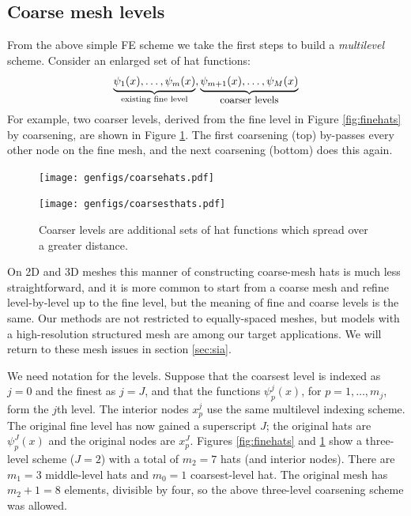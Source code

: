 \documentclass[letterpaper,final,12pt,reqno]{amsart}
\theoremstyle{claim}
\numberwithin{equation}{section}
\numberwithin{figure}{section}
\numberwithin{table}{section}
\numberwithin{theorem}{section}
\begin{document}
\subsection*{Coarse mesh levels}  From the above simple FE scheme we take the first steps to build a \emph{multilevel} scheme.  Consider an enlarged set of hat functions:
    $$\underbrace{\psi_1(x),\dots,\psi_m(x)}_{\text{existing fine level}},\underbrace{\psi_{m+1}(x),\dots,\psi_M(x)}_{\text{\small coarser levels}}$$
For example, two coarser levels, derived from the fine level in Figure \ref{fig:finehats} by coarsening, are shown in Figure \ref{fig:coarsehats}.  The first coarsening (top) by-passes every other node on the fine mesh, and the next coarsening (bottom) does this again.

\begin{figure}
\texttt{[image: genfigs/coarsehats.pdf]}
\smallskip

\texttt{[image: genfigs/coarsesthats.pdf]}
\caption{Coarser levels are additional sets of hat functions which spread over a greater distance.}
\label{fig:coarsehats}
\end{figure}

On 2D and 3D meshes this manner of constructing coarse-mesh hats is much less straightforward, and it is more common to start from a coarse mesh and refine level-by-level up to the fine level, but the meaning of fine and coarse levels is the same.  Our methods are not restricted to equally-spaced meshes, but models with a high-resolution structured mesh \cite{Bueler2016,Winkelmannetal2011} are among our target applications. We will return to these mesh issues in section \ref{sec:sia}.

We need notation for the levels.  Suppose that the coarsest level is indexed as $j=0$ and the finest as $j=J$, and that the functions $\psi_p^j(x)$, for $p=1,\dots,m_j$, form the $j$th level.  The interior nodes $x_p^j$ use the same multilevel indexing scheme.  The original fine level has now gained a superscript $J$; the original hats are $\psi_p^J(x)$ and the original nodes are $x_p^J$.  Figures \ref{fig:finehats} and \ref{fig:coarsehats} show a three-level scheme ($J=2$) with a total of $m_2=7$ hats (and interior nodes).  There are $m_1=3$ middle-level hats and $m_0=1$ coarsest-level hat.  The original mesh has $m_2+1=8$ elements, divisible by four, so the above three-level coarsening scheme was allowed.
\end{document}
